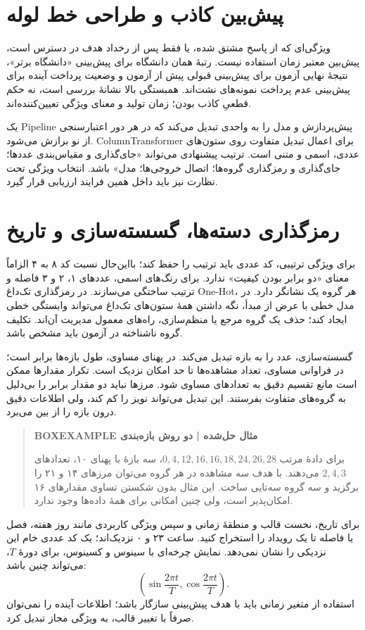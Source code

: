 \section{پیش‌بین کاذب و طراحی خط لوله}
ویژگی‌ای که از پاسخ مشتق شده، یا فقط پس از رخداد هدف در دسترس است، پیش‌بین معتبر زمان استفاده نیست. رتبهٔ همان دانشگاه برای پیش‌بینی «دانشگاه برتر»، نتیجهٔ نهایی آزمون برای پیش‌بینی قبولی پیش از آزمون و وضعیت پرداخت آینده برای پیش‌بینی عدم پرداخت نمونه‌های نشت‌اند. همبستگی بالا نشانهٔ بررسی است، نه حکم قطعیِ کاذب بودن؛ زمان تولید و معنای ویژگی تعیین‌کننده‌اند.

یک Pipeline پیش‌پردازش و مدل را به واحدی تبدیل می‌کند که در هر دور اعتبارسنجی از نو برازش می‌شود. ColumnTransformer برای اعمال تبدیل متفاوت روی ستون‌های عددی، اسمی و متنی است. ترتیب پیشنهادی می‌تواند «جای‌گذاری و مقیاس‌بندی عددها؛ جای‌گذاری و رمزگذاری گروه‌ها؛ اتصال خروجی‌ها؛ مدل» باشد. انتخاب ویژگی تحت نظارت نیز باید داخل همین فرایند ارزیابی قرار گیرد.

\section{رمزگذاری دسته‌ها، گسسته‌سازی و تاریخ}
برای ویژگی ترتیبی، کد عددی باید ترتیب را حفظ کند؛ بااین‌حال نسبت کد ۸ به ۴ الزاماً معنای «دو برابر بودن کیفیت» ندارد. برای رنگ‌های اسمی، عددهای ۱، ۲ و ۳ فاصله و ترتیب ساختگی می‌سازند. در رمزگذاری تک‌داغ One-Hot، هر گروه یک نشانگر دارد. در مدل خطی با عرض از مبدأ، نگه داشتن همهٔ ستون‌های تک‌داغ می‌تواند وابستگی خطی ایجاد کند؛ حذف یک گروه مرجع یا منظم‌سازی، راه‌های معمول مدیریت آن‌اند. تکلیف گروه ناشناخته در آزمون باید مشخص باشد.

گسسته‌سازی، عدد را به بازه تبدیل می‌کند. در پهنای مساوی، طول بازه‌ها برابر است؛ در فراوانی مساوی، تعداد مشاهده‌ها تا حد امکان نزدیک است. تکرار مقدارها ممکن است مانع تقسیم دقیق به تعدادهای مساوی شود. مرزها نباید دو مقدار برابر را بی‌دلیل به گروه‌های متفاوت بفرستند. این تبدیل می‌تواند نویز را کم کند، ولی اطلاعات دقیق درون بازه را از بین می‌برد.

\begin{quote}\textbf{BOXEXAMPLE مثال حل‌شده | دو روش بازه‌بندی}\par 
برای دادهٔ مرتب $0,4,12,16,16,18,24,26,28$، سه بازهٔ با پهنای ۱۰، تعدادهای $2,4,3$ می‌دهند. با هدف سه مشاهده در هر گروه می‌توان مرزهای ۱۴ و ۲۱ را برگزید و سه گروه سه‌تایی ساخت. این مثال بدون شکستن تساوی مقدارهای ۱۶ امکان‌پذیر است، ولی چنین امکانی برای همهٔ داده‌ها وجود ندارد.
\end{quote}

برای تاریخ، نخست قالب و منطقهٔ زمانی و سپس ویژگی کاربردی مانند روز هفته، فصل یا فاصله تا یک رویداد را استخراج کنید. ساعت ۲۳ و ۰ نزدیک‌اند؛ یک کد عددی خام این نزدیکی را نشان نمی‌دهد. نمایش چرخه‌ای با سینوس و کسینوس، برای دورهٔ $T$، می‌تواند چنین باشد:
\[\left(\sin\frac{2\pi t}{T},\cos\frac{2\pi t}{T}\right).\]
استفاده از متغیر زمانی باید با هدف پیش‌بینی سازگار باشد؛ اطلاعات آینده را نمی‌توان صرفاً با تغییر قالب، به ویژگی مجاز تبدیل کرد.

